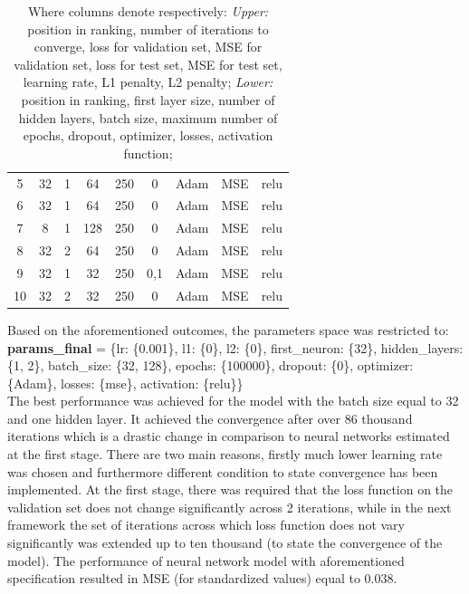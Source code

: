\documentclass{Trade_template}
\numberwithin{equation}{section}
\begin{document}
\begin{table}[H]
{\begin{tabular}{*{9}{c}}
5  & 32            & 1              & 64          & 250    & 0       & Adam      & MSE    & relu       \\
6  & 32            & 1              & 64          & 250    & 0       & Adam      & MSE    & relu       \\
7  & 8             & 1              & 128         & 250    & 0       & Adam      & MSE    & relu       \\
8  & 32            & 2              & 64          & 250    & 0       & Adam      & MSE    & relu       \\
9  & 32            & 1              & 32          & 250    & 0,1     & Adam      & MSE    & relu       \\
10 & 32            & 2              & 32          & 250    & 0       & Adam      & MSE    & relu      \\ \bottomrule
\end{tabular}
\caption*{\footnotesize{Where columns denote respectively: \textit{Upper:} position in ranking, number of iterations to converge, loss for validation set, MSE for validation set, loss for test set, MSE for test set, learning rate, L1 penalty, L2 penalty; \textit{Lower:} position in ranking, first layer size, number of hidden layers, batch size, maximum number of epochs, dropout, optimizer, losses, activation function;}}}
\end{table}

Based on the aforementioned outcomes, the parameters space was restricted to: \\ 

\textbf{params\_final} = \{lr: \{0.001\},
        l1: \{0\},
        l2: \{0\},
        first\_neuron: \{32\},
        hidden\_layers: \{1, 2\},
        batch\_size: \{32, 128\},
        epochs: \{100000\},
        dropout: \{0\},
        optimizer: \{Adam\},
        losses: \{mse\},
        activation: \{relu\}\}\\
 
The best performance was achieved for the model with the batch size equal to 32 and one hidden layer. It achieved the convergence after over 86 thousand iterations which is a drastic change in comparison to neural networks estimated at the first stage. There are two main reasons, firstly much lower learning rate was chosen and furthermore different condition to state convergence has been implemented. At the first stage, there was required that the loss function on the validation set does not change significantly across 2 iterations, while in the next framework the set of iterations across which loss function does not vary significantly was extended up to ten thousand (to state the convergence of the model). The performance of neural network model with aforementioned specification resulted in MSE (for standardized values) equal to 0.038.
\end{document}
